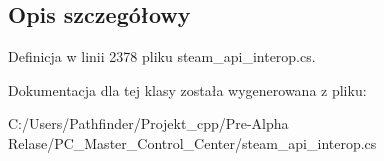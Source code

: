 \subsection{Opis szczegółowy}


Definicja w linii 2378 pliku steam\+\_\+api\+\_\+interop.\+cs.



Dokumentacja dla tej klasy została wygenerowana z pliku\+:\begin{DoxyCompactItemize}
\item 
C\+:/\+Users/\+Pathfinder/\+Projekt\+\_\+cpp/\+Pre-\/\+Alpha Relase/\+P\+C\+\_\+\+Master\+\_\+\+Control\+\_\+\+Center/steam\+\_\+api\+\_\+interop.\+cs\end{DoxyCompactItemize}
